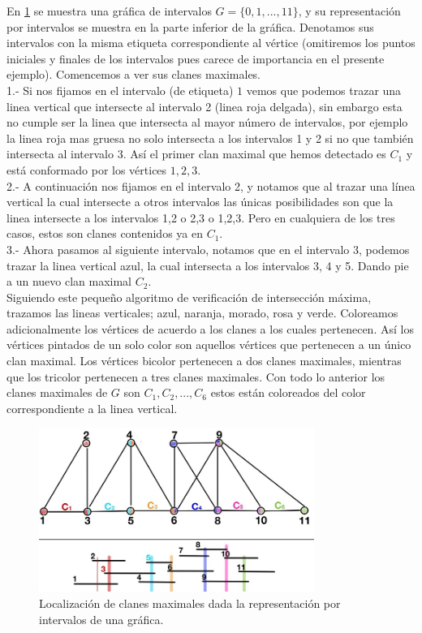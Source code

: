 En \cref{fig:MaxClqs01} se muestra una gráfica de intervalos $G=\{ 0,1, ..., 11\}$, y su representación por intervalos se muestra en la parte inferior de la gráfica. Denotamos sus intervalos con la misma etiqueta correspondiente al vértice (omitiremos los puntos iniciales y finales de los intervalos pues carece de importancia en el presente ejemplo).     
Comencemos a ver sus clanes maximales.\\
1.- Si nos fijamos en el intervalo (de etiqueta) $1$ vemos que podemos trazar una linea vertical que intersecte al intervalo 2 (linea roja delgada), sin embargo esta no cumple ser la linea que intersecta al mayor número de intervalos, por ejemplo la linea roja mas gruesa no solo intersecta a los intervalos 1 y 2 si no que también intersecta al intervalo 3. Así el primer clan maximal que hemos detectado es $C_1$ y está conformado por los vértices $1,2,3$.\\
2.- A continuación nos fijamos en el intervalo 2, y notamos que al trazar una línea vertical la cual intersecte a otros intervalos las únicas posibilidades son que la linea intersecte a los intervalos 1,2 o 2,3 o 1,2,3. Pero en cualquiera de los tres casos, estos son clanes contenidos ya en $C_1$.\\
3.- Ahora pasamos al siguiente intervalo, notamos que en el intervalo 3, podemos trazar la linea vertical azul, la cual intersecta a los intervalos 3, 4 y 5. Dando pie a un nuevo clan maximal $C_2$. \\
Siguiendo este pequeño algoritmo de verificación de intersección máxima, trazamos las lineas verticales; azul, naranja, morado, rosa y verde. Coloreamos adicionalmente los vértices de acuerdo a los clanes a los cuales pertenecen. Así los vértices pintados de un solo color son aquellos vértices que pertenecen a un  único clan maximal. Los vértices bicolor pertenecen a dos clanes maximales, mientras que los tricolor pertenecen a tres clanes maximales. Con todo lo anterior los clanes maximales de $G$ son $C_1, C_2, ..., C_6$ estos están coloreados del color correspondiente a la linea vertical.    


\begin{figure}[H]
  \centering
  \includegraphics[width=0.8\textwidth]{recursos/capturas/208.jpg}
  \caption{Localización de clanes maximales dada la representación por intervalos de una gráfica.}
  \label{fig:MaxClqs01}
\end{figure}

